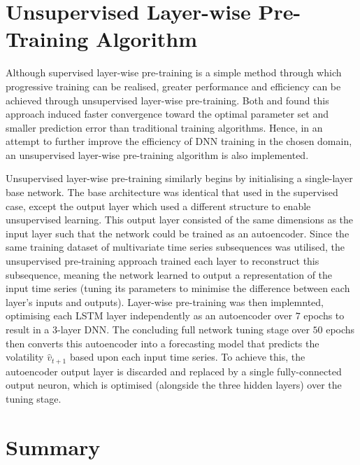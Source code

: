 \documentclass[a4paper, 11pt]{report}
\begin{document}
    \section{Unsupervised Layer-wise Pre-Training Algorithm}

    Although supervised layer-wise pre-training is a simple method through which progressive training can be realised, greater performance and efficiency can be achieved through unsupervised layer-wise pre-training. Both \citet{xu-2018} and \citet{sagheer-2019} found this approach induced faster convergence toward the optimal parameter set and smaller prediction error than traditional training algorithms. Hence, in an attempt to further improve the efficiency of DNN training in the chosen domain, an unsupervised layer-wise pre-training algorithm is also implemented.

    Unsupervised layer-wise pre-training similarly begins by initialising a single-layer base network. The base architecture was identical that used in the supervised case, except the output layer which used a different structure to enable unsupervised learning. This output layer consisted of the same dimensions as the input layer such that the network could be trained as an autoencoder. Since the same training dataset of multivariate time series subsequences was utilised, the unsupervised pre-training approach trained each layer to reconstruct this subsequence, meaning the network learned to output a representation of the input time series (tuning its parameters to minimise the difference between each layer's inputs and outputs). Layer-wise pre-training was then implemnted, optimising each LSTM layer independently as an autoencoder over $7$ epochs to result in a 3-layer DNN. The concluding full network tuning stage over $50$ epochs then converts this autoencoder into a forecasting model that predicts the volatility $\hat{v}_{t+1}$ based upon each input time series. To achieve this, the autoencoder output layer is discarded and replaced by a single fully-connected output neuron, which is optimised (alongside the three hidden layers) over the tuning stage.


    \section{Summary}
\end{document}
